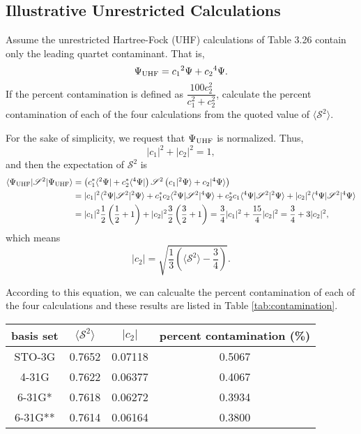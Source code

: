\documentclass[a4paper]{book}
\newcounter{exercise}[chapter]
\newcounter{solution}[chapter]
\newcommand\Tableref[1]{Table \ref{#1}}
\begin{document}
	\subsection{Illustrative Unrestricted Calculations}
	
	\begin{exercise}
	Assume the unrestricted Hartree-Fock (UHF) calculations of Table 3.26 contain only the leading quartet contaminant. That is,
	\[
	 	\Psi_{\rm UHF} = c_1 {}^{2} \Psi + c_2 {}^{4} \Psi .
	\]
	If the percent contamination is defined as $\dfrac{ 100 c^2_2 }{ c^2_1 + c^2_2 }$, calculate the percent contamination of each of the four calculations from the quoted value of $\langle \mathscr{S}^2 \rangle$.
	\end{exercise}
	
	\begin{solution}
	
	For the sake of simplicity, we request that $\Psi_{\rm UHF}$ is normalized. Thus,
	\[
		| c_1 |^2 + | c_2 |^2 = 1 ,
	\]
	and then the expectation of $\mathscr{S}^2$ is
	\begin{align*}
		\langle \Psi_{\rm UHF} | \mathscr{S}^2 | \Psi_{\rm UHF} \rangle &= \left( c^*_1 \langle {}^{2} \Psi | + c^*_2 \langle {}^{4} \Psi | \right) \mathscr{S}^2 \left( c_1 | {}^{2} \Psi \rangle + c_2 | {}^{4} \Psi \rangle \right) \\
		&= | c_1 |^2 \langle {}^{2} \Psi | \mathscr{S}^2 | {}^{2} \Psi \rangle + c^*_1 c_2 \langle {}^{2} \Psi | \mathscr{S}^2 | {}^{4} \Psi \rangle + c^*_2 c_1 \langle {}^{4} \Psi | \mathscr{S}^2 | {}^{2} \Psi \rangle + | c_2 |^2 \langle {}^{4} \Psi | \mathscr{S}^2 | {}^{4} \Psi \rangle \\
		&= | c_1 |^2 \frac{1}{2} \left( \frac{1}{2} + 1 \right) + | c_2 |^2 \frac{3}{2} \left( \frac{3}{2} + 1 \right) = \frac{3}{4} | c_1 |^2 + \frac{15}{4} | c_2 |^2 = \frac{3}{4} + 3 | c_2 |^2 ,
	\end{align*}
	which means
	\[
		| c_2 | =  \sqrt{ \frac{1}{3} \left( \langle \mathscr{S}^2 \rangle - \frac{3}{4} \right) } .
	\]
	
	According to this equation, we can calcualte the percent contamination of each of the four calculations and these results are listed in \Tableref{tab:contamination}.
	\vspace{-1em}
	\begin{center}
	\label{tab:contamination}
	\begin{tabular}{c|c|c|c}\hline
	basis set & $\langle \mathscr{S}^2 \rangle$ & $| c_2 |$ & percent contamination (\%) \\ \hline
	STO-3G 	& 0.7652 &  0.07118 & 0.5067 \\
	4-31G  	& 0.7622 &  0.06377	& 0.4067 \\
	6-31G* 	& 0.7618 &	0.06272 & 0.3934 \\
	6-31G** & 0.7614 &  0.06164 & 0.3800 \\ \hline 
	\end{tabular}
	\end{center}
	
	\end{solution}
	
\end{document}

